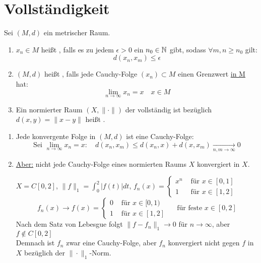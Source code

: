 


\section{Vollst{\"a}ndigkeit}



\begin{definition}
	Sei $(M, d)$ ein metrischer Raum.
	\begin{enumerate}[label=\alph*\upshape)]
		\item $x_{n} \in M$ hei{\ss}t , falls es zu jedem $\epsilon > 0$ ein $n_{0} \in \mathbb{N}$ gibt, sodass $\forall m, n \geq n_{0}$ gilt:
			\[ d(x_{n}, x_{m}) \leq \epsilon \]
		\item $(M, d)$ hei{\ss}t , falls jede Cauchy-Folge $(x_{n}) \subset M$ einen Grenzwert \uline{in M} hat:
			\[ \lim_{n \rightarrow \infty} x_{n} = x \quad x \in M \]
		\item Ein normierter Raum $(X, \| \cdot \|)$ der vollständig ist bezüglich $d(x, y) = \| x - y \|$ heißt .
	\end{enumerate}
\end{definition}


\begin{bemerkung}
	\begin{enumerate}[label=\alph*\upshape)]
		\item Jede konvergente Folge in $(M, d)$ ist eine Cauchy-Folge:
			\[ \text{Sei } \lim_{n \rightarrow \infty} x_{n} = x: \quad d(x_{n}, x_{m}) \leq d(x_{n}, x) + d(x, x_{m}) \xrightarrow[n, m \rightarrow \infty]{} 0 \]
		\item \uline{Aber:} nicht jede Cauchy-Folge eines normierten Raums $X$ konvergiert in $X$.
			\begin{beispiel*}
				$X = C[0, 2]$, $\| f \|_{1} = \int_{0}^{2} | f(t) | dt$, $f_{n}(x) = \begin{cases}x^{n} & \text{ für } x \in [0, 1] \\ 1 & \text{ für } x \in [1, 2]\end{cases}$	
				\[ f_{n}(x) \rightarrow f(x) = \begin{cases} 0 & \text{ für } x \in [0, 1) \\ 1 & \text{ für } x \in [1, 2] \end{cases} \quad \text{ für feste } x \in [0, 2] \]
				Nach dem Satz von Lebesgue folgt $\| f - f_{n} \|_{1} \rightarrow 0$ für $n \rightarrow \infty$, aber $f \notin C[0, 2]$ \\
				Demnach ist $f_{n}$ zwar eine Cauchy-Folge, aber $f_{n}$ konvergiert nicht gegen $f$ in $X$ bezüglich der $\| \cdot \|_{1}$-Norm.
			\end{beispiel*}
	\end{enumerate}	
\end{bemerkung}


